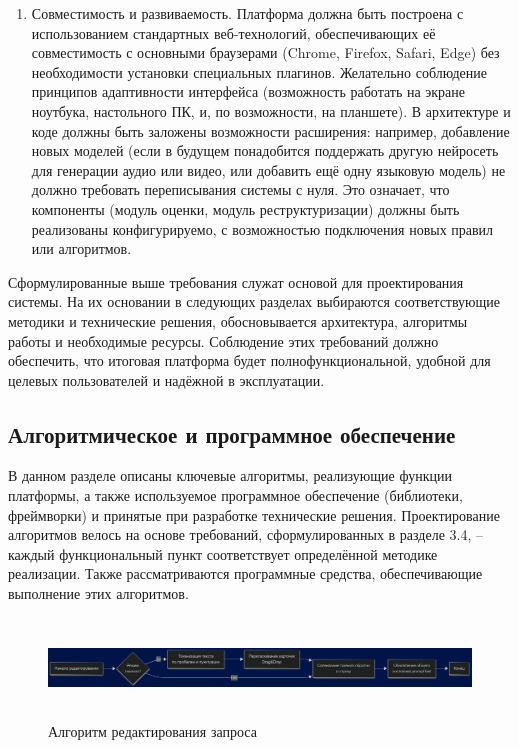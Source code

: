 \begin{enumerate}[label=\arabic*]
    \item Совместимость и развиваемость. Платформа должна быть построена с использованием стандартных веб-технологий, обеспечивающих её совместимость с основными браузерами (Chrome, Firefox, Safari, Edge) без необходимости установки специальных плагинов. Желательно соблюдение принципов адаптивности интерфейса (возможность работать на экране ноутбука, настольного ПК, и, по возможности, на планшете). В архитектуре и коде должны быть заложены возможности расширения: например, добавление новых моделей (если в будущем понадобится поддержать другую нейросеть для генерации аудио или видео, или добавить ещё одну языковую модель) не должно требовать переписывания системы с нуля. Это означает, что компоненты (модуль оценки, модуль реструктуризации) должны быть реализованы конфигурируемо, с возможностью подключения новых правил или алгоритмов.
\end{enumerate}
Сформулированные выше требования служат основой для проектирования системы. На их основании в следующих разделах выбираются соответствующие методики и технические решения, обосновывается архитектура, алгоритмы работы и необходимые ресурсы. Соблюдение этих требований должно обеспечить, что итоговая платформа будет полнофункциональной, удобной для целевых пользователей и надёжной в эксплуатации.
\subsection{Алгоритмическое и программное обеспечение}
В данном разделе описаны ключевые алгоритмы, реализующие функции платформы, а также используемое программное обеспечение (библиотеки, фреймворки) и принятые при разработке технические решения. Проектирование алгоритмов велось на основе требований, сформулированных в разделе 3.4, – каждый функциональный пункт соответствует определённой методике реализации. Также рассматриваются программные средства, обеспечивающие выполнение этих алгоритмов.

\begin{figure}[htbp]
    \centering
    \includegraphics[width=1\textwidth, height=100]{picture/diploma-inter-algo-1.png}
    \caption{Алгоритм редактирования запроса}
    \label{algo-1}
\end{figure}

